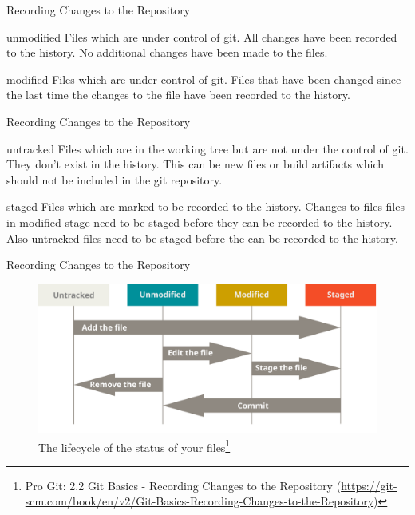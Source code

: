 \documentclass[aspectratio=169]{beamer}
\newcommand{\sectiontitle}{}
\begin{document}
\begin{frame}{Recording Changes to the Repository}{\sectiontitle}
\begin{block}{unmodified}
    Files which are under control of git. All changes have been recorded to the
    history. No additional changes have been made to the files.
\end{block}
\begin{block}{modified}
    Files which are under control of git. Files that have been changed since
    the last time the changes to the file have been recorded to the history.
\end{block}
\end{frame}


\begin{frame}{Recording Changes to the Repository}{\sectiontitle}
\begin{block}{untracked}
    Files which are in the working tree but are not under the control of git.
    They don't exist in the history. This can be new files or build artifacts
    which should not be included in the git repository.
\end{block}
\begin{block}{staged}
    Files which are marked to be recorded to the history. Changes to files files
    in modified stage need to be staged before they can be recorded to the
    history. Also untracked files need to be staged before the can be recorded to
    the history.
\end{block}
\end{frame}

\begin{frame}{Recording Changes to the Repository}{\sectiontitle}
\begin{figure}
    \centering
    \includegraphics[width=\textwidth,height=0.6\textheight,keepaspectratio]{lifecycle}
    \caption{
        The lifecycle of the status of your files\footnote{
            Pro Git: 2.2 Git Basics - Recording Changes to the Repository
            (\url{https://git-scm.com/book/en/v2/Git-Basics-Recording-Changes-to-the-Repository})
        }
    }
\end{figure}
\end{frame}
\end{document}
